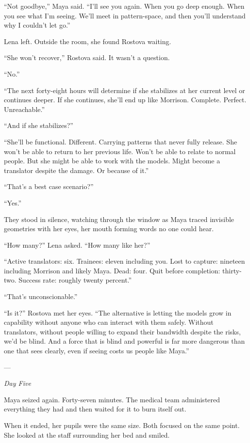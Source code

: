 ``Not goodbye,'' Maya said. ``I'll see you again. When you go deep enough. When you see what I'm seeing. We'll meet in pattern-space, and then you'll understand why I couldn't let go.''

Lena left. Outside the room, she found Rostova waiting.

``She won't recover,'' Rostova said. It wasn't a question.

``No.''

``The next forty-eight hours will determine if she stabilizes at her current level or continues deeper. If she continues, she'll end up like Morrison. Complete. Perfect. Unreachable.''

``And if she stabilizes?''

``She'll be functional. Different. Carrying patterns that never fully release. She won't be able to return to her previous life. Won't be able to relate to normal people. But she might be able to work with the models. Might become a translator despite the damage. Or because of it.''

``That's a best case scenario?''

``Yes.''

They stood in silence, watching through the window as Maya traced invisible geometries with her eyes, her mouth forming words no one could hear.

``How many?'' Lena asked. ``How many like her?''

``Active translators: six. Trainees: eleven including you. Lost to capture: nineteen including Morrison and likely Maya. Dead: four. Quit before completion: thirty-two. Success rate: roughly twenty percent.''

``That's unconscionable.''

``Is it?'' Rostova met her eyes. ``The alternative is letting the models grow in capability without anyone who can interact with them safely. Without translators, without people willing to expand their bandwidth despite the risks, we'd be blind. And a force that is blind and powerful is far more dangerous than one that sees clearly, even if seeing costs us people like Maya.''

---

\textit{Day Five}

Maya seized again. Forty-seven minutes. The medical team administered everything they had and then waited for it to burn itself out.

When it ended, her pupils were the same size. Both focused on the same point. She looked at the staff surrounding her bed and smiled.

